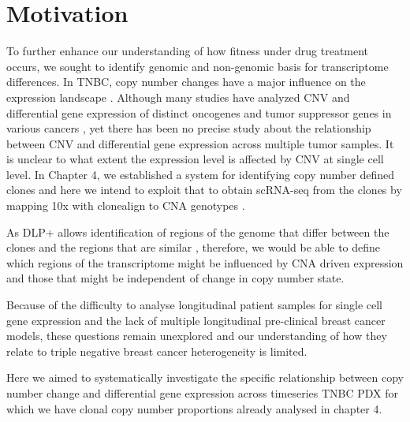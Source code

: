 






 \section{Motivation}


To further enhance our understanding of how fitness under drug treatment occurs, we sought to identify genomic and non-genomic basis for transcriptome differences. 
In TNBC, copy number changes have a major influence on the expression landscape \cite{wang2016integrative}.
Although many studies have analyzed CNV and differential gene expression of distinct oncogenes and tumor suppressor genes in various cancers \cite{kuzyk2015mycn, budczies2016pan, kwak2015fibroblast}, yet there has been no precise study about the relationship between CNV and differential gene expression across multiple tumor samples. It is unclear to what extent the expression level is affected by CNV at single cell level.
In Chapter 4, we established a system for identifying copy number defined clones and here we intend to exploit that to obtain scRNA-seq from the clones by mapping 10x with clonealign to CNA genotypes \cite{campbell2019clonealign}.

As \ac{DLP+} allows identification of regions of the genome that differ between the clones and the regions that are similar \cite{laks2019clonal}, therefore, we would be able to define which regions of the transcriptome might be influenced by CNA driven expression and those that might be independent of change in copy number state.

Because of the difficulty to analyse longitudinal patient samples for single cell gene expression and the lack of multiple longitudinal pre-clinical breast cancer models, these questions remain unexplored and our understanding of how they relate to triple negative breast cancer heterogeneity is limited.

Here we aimed to systematically investigate the specific relationship between copy number change and differential gene expression across timeseries TNBC PDX for which we have clonal copy number proportions already analysed in chapter 4. 


